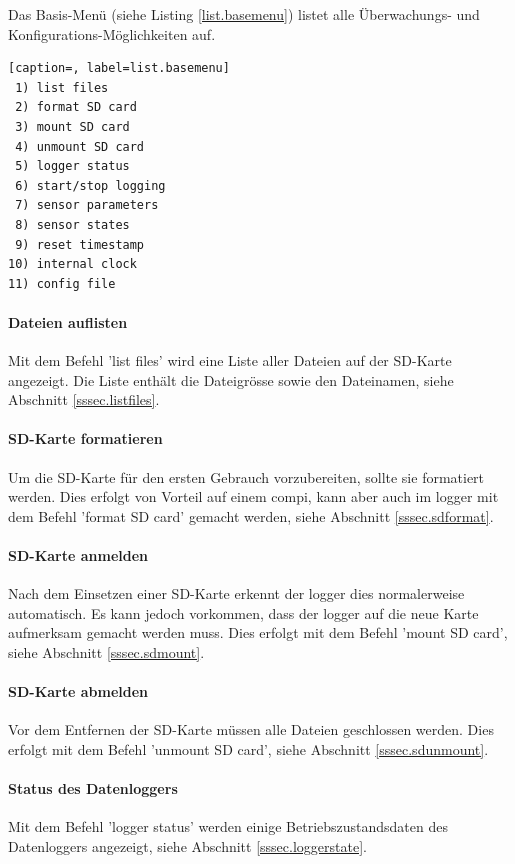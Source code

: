 Das Basis-Menü (siehe Listing \ref{list.basemenu}) listet alle Überwachungs- und Konfigurations-Möglichkeiten auf. 

\begin{lstlisting}[caption=, label=list.basemenu]
 1) list files
 2) format SD card
 3) mount SD card
 4) unmount SD card
 5) logger status
 6) start/stop logging
 7) sensor parameters
 8) sensor states
 9) reset timestamp
10) internal clock
11) config file
\end{lstlisting}

\paragraph{Dateien auflisten} Mit dem Befehl 'list files' wird eine Liste aller Dateien auf der SD-Karte angezeigt. Die Liste enthält die Dateigrösse sowie den Dateinamen, siehe Abschnitt \ref{sssec.listfiles}.

\paragraph{SD-Karte formatieren} Um die SD-Karte für den ersten Gebrauch vorzubereiten, sollte sie formatiert werden. Dies erfolgt von Vorteil auf einem \gls{compi}, kann aber auch im \gls{logger} mit dem Befehl 'format SD card' gemacht werden, siehe Abschnitt \ref{sssec.sdformat}.

\paragraph{SD-Karte anmelden} Nach dem Einsetzen einer SD-Karte erkennt der \gls{logger} dies normalerweise automatisch. Es kann jedoch vorkommen, dass der \gls{logger} auf die neue Karte aufmerksam gemacht werden muss. Dies erfolgt mit dem Befehl 'mount SD card', siehe Abschnitt \ref{sssec.sdmount}.

\paragraph{SD-Karte abmelden} Vor dem Entfernen der SD-Karte müssen alle Dateien geschlossen werden. Dies erfolgt mit dem Befehl 'unmount SD card', siehe Abschnitt \ref{sssec.sdunmount}.

\paragraph{Status des Datenloggers} Mit dem Befehl 'logger status' werden einige Betriebszustandsdaten des Datenloggers angezeigt, siehe Abschnitt \ref{sssec.loggerstate}.

